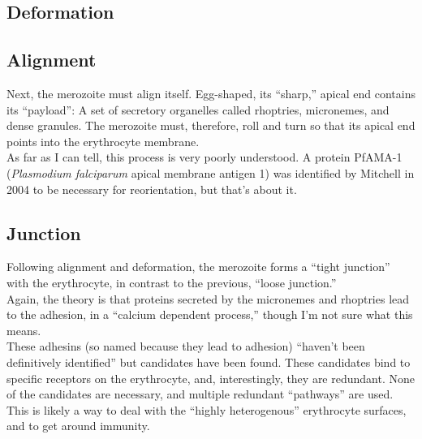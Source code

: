 \documentclass{article}
\begin{document}
\subsection{Deformation}

%

\subsection{Alignment}

Next, the merozoite must align itself. Egg-shaped, its ``sharp,'' apical end contains its ``payload'': A set of secretory organelles called rhoptries, micronemes, and dense granules. The merozoite must, therefore, roll and turn so that its apical end points into the erythrocyte membrane.\\

As far as I can tell, this process is very poorly understood. A protein PfAMA-1 (\emph{Plasmodium falciparum} apical membrane antigen 1) was identified by Mitchell in 2004 to be necessary for reorientation\cite{Mitchell2004}, but that's about it.

\subsection{Junction}

Following alignment and deformation, the merozoite forms a ``tight junction'' with the erythrocyte, in contrast to the previous, ``loose junction.''\\

Again, the theory is that proteins secreted by the micronemes and rhoptries lead to the adhesion, in a ``calcium dependent process,'' though I'm not sure what this means\cite{Crick2014a}.\\

These adhesins (so named because they lead to adhesion) ``haven't been definitively identified'' but candidates have been found. These candidates bind to specific receptors on the erythrocyte, and, interestingly, they are redundant. None of the candidates are necessary, and multiple redundant ``pathways'' are used. This is likely a way to deal with the ``highly heterogenous'' erythrocyte surfaces, and to get around immunity.\\
\end{document}
